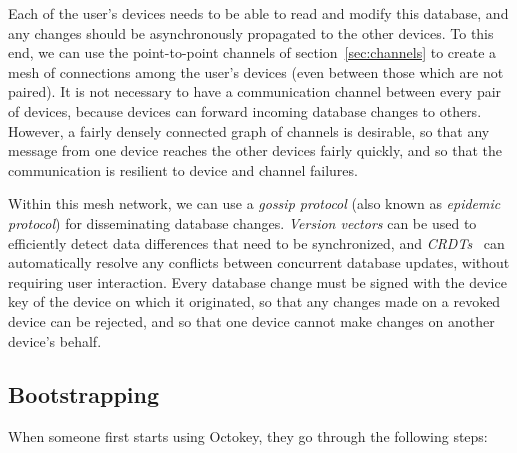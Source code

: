 Each of the user's devices needs to be able to read and modify this database, and any changes should
be asynchronously propagated to the other devices. To this end, we can use the point-to-point
channels of section~\ref{sec:channels} to create a mesh of connections among the user's devices
(even between those which are not paired). It is not necessary to have a communication channel
between every pair of devices, because devices can forward incoming database changes to others.
However, a fairly densely connected graph of channels is desirable, so that any message from one
device reaches the other devices fairly quickly, and so that the communication is resilient to
device and channel failures.

Within this mesh network, we can use a \emph{gossip protocol} (also known as \emph{epidemic
protocol}) \cite{Demers89} for disseminating database changes. \emph{Version vectors}
\cite{ParkerJr83} can be used to efficiently detect data differences that need to be synchronized,
and \emph{CRDTs}~\cite{Shapiro11} can automatically resolve any conflicts between concurrent
database updates, without requiring user interaction. Every database change must be signed with the
device key of the device on which it originated, so that any changes made on a revoked device can be
rejected, and so that one device cannot make changes on another device's behalf.

\subsection{Bootstrapping}\label{sec:bootstrap}

When someone first starts using Octokey, they go through the following steps:

